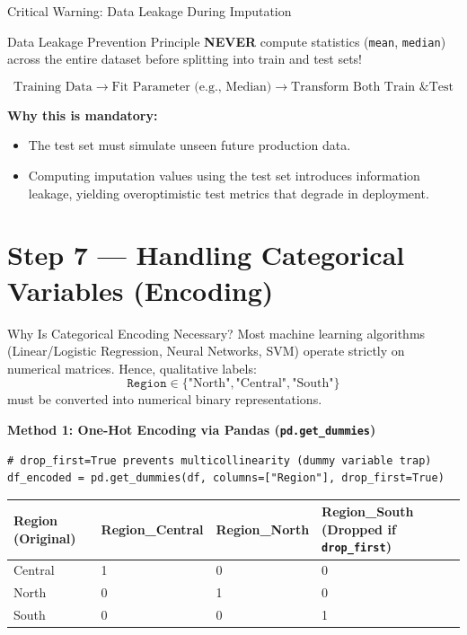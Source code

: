 \documentclass[aspectratio=169,11pt]{beamer}
\newcommand{\code}[1]{\texttt{#1}}
\newcommand{\smallgap}{\vspace{0.35em}}
\begin{document}
\begin{frame}{Critical Warning: Data Leakage During Imputation}
\begin{alertblock}{Data Leakage Prevention Principle}
\textbf{NEVER} compute statistics (\code{mean}, \code{median}) across the entire dataset before splitting into train and test sets!
\end{alertblock}

\smallgap
\begin{center}
\large
\[
\text{Training Data} \longrightarrow \text{Fit Parameter (e.g., Median)} \longrightarrow \text{Transform Both Train \& Test}
\]
\end{center}

\smallgap
\textbf{Why this is mandatory:}
\begin{itemize}
  \item The test set must simulate unseen future production data.
  \item Computing imputation values using the test set introduces information leakage, yielding overoptimistic test metrics that degrade in deployment.
\end{itemize}
\end{frame}

\section{Step 7 — Handling Categorical Variables (Encoding)}

\begin{frame}[fragile]{Why Is Categorical Encoding Necessary?}
Most machine learning algorithms (Linear/Logistic Regression, Neural Networks, SVM) operate strictly on numerical matrices. Hence, qualitative labels:
\[
\code{Region} \in \{\text{"North"}, \text{"Central"}, \text{"South"}\}
\]
must be converted into numerical binary representations.

\smallgap
\textbf{Method 1: One-Hot Encoding via Pandas (\code{pd.get\_dummies})}
\begin{lstlisting}[style=pythonstyle]
# drop_first=True prevents multicollinearity (dummy variable trap)
df_encoded = pd.get_dummies(df, columns=["Region"], drop_first=True)
\end{lstlisting}

\smallgap
\begin{tabularx}{\textwidth}{lXXX}
\toprule
\textbf{Region (Original)} & \textbf{Region\_Central} & \textbf{Region\_North} & \textbf{Region\_South} (Dropped if \code{drop\_first}) \\
\midrule
Central & 1 & 0 & 0 \\
North & 0 & 1 & 0 \\
South & 0 & 0 & 1 \\
\bottomrule
\end{tabularx}
\end{frame}
\end{document}
